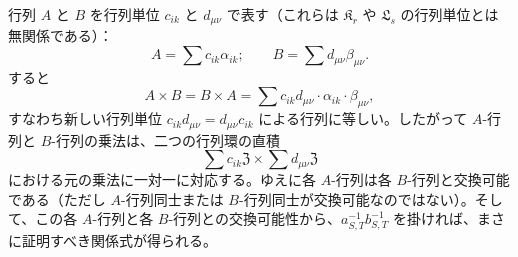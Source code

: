行列 \(A\) と \(B\) を行列単位 \(c_{ik}\) と \(d_{\mu\nu}\) で表す（これらは \(\mathfrak K_r\) や \(\mathfrak L_s\) の行列単位とは無関係である）：
\[
A=\sum c_{ik}\alpha_{ik};\qquad
B=\sum d_{\mu\nu}\beta_{\mu\nu}.
\]
すると
\[
A\times B=B\times A
=\sum c_{ik}d_{\mu\nu}\cdot\alpha_{ik}\cdot\beta_{\mu\nu},
\]
すなわち新しい行列単位 \(c_{ik}d_{\mu\nu}=d_{\mu\nu}c_{ik}\) による行列に等しい。したがって \(A\)-行列と \(B\)-行列の乗法は、二つの行列環の直積
\[
\sum c_{ik}\mathfrak Z\times\sum d_{\mu\nu}\mathfrak Z
\]
における元の乗法に一対一に対応する。ゆえに各 \(A\)-行列は各 \(B\)-行列と交換可能である（ただし \(A\)-行列同士または \(B\)-行列同士が交換可能なのではない）。そして、この各 \(A\)-行列と各 \(B\)-行列との交換可能性から、\(a_{S,T}^{-1}b_{S,T}^{-1}\) を掛ければ、まさに証明すべき関係式が得られる。
